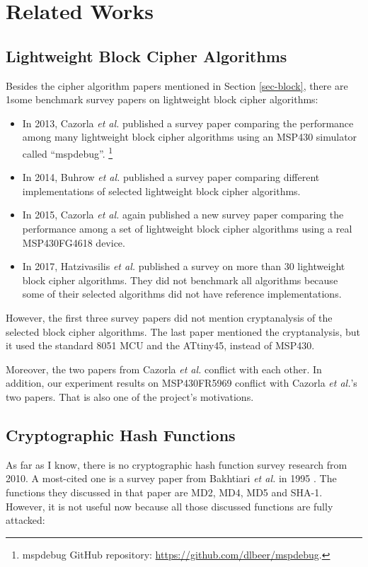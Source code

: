 \documentclass[sigconf, review=false]{acmart}
\begin{document}
\section{Related Works}
\subsection{Lightweight Block Cipher Algorithms}
Besides the cipher algorithm papers mentioned in Section \ref{sec-block},
there are 1some benchmark survey papers on lightweight block cipher algorithms:

\begin{itemize}
    \item In 2013, Cazorla \textit{et al.} published a survey paper comparing the performance among
          many lightweight block cipher algorithms using an MSP430 simulator called ``mspdebug''.
          \footnote{mspdebug GitHub repository: \url{https://github.com/dlbeer/mspdebug}.} \cite{cazorla2013survey}
    \item In 2014, Buhrow \textit{et al.} published a survey paper comparing different implementations
          of selected lightweight block cipher algorithms. \cite{buhrow2014block}
    \item In 2015, Cazorla \textit{et al.} again published a new survey paper comparing the performance among
          a set of lightweight block cipher algorithms using a real MSP430FG4618 device. \cite{cazorla2015survey}
    \item In 2017, Hatzivasilis \textit{et al.} published a survey on more than 30 lightweight block cipher algorithms.
          They did not benchmark all algorithms because some of their selected algorithms did not have reference implementations. \cite{hatzivasilis2017review}
\end{itemize}

However, the first three survey papers did not mention cryptanalysis of the selected block cipher algorithms.
The last paper mentioned the cryptanalysis, but it used the standard 8051 MCU and the ATtiny45, instead of MSP430.

Moreover, the two papers from Cazorla \textit{et al.} conflict with each other.
In addition, our experiment results on MSP430FR5969 conflict with Cazorla \textit{et al.}'s two papers.
That is also one of the project's motivations.

\subsection{Cryptographic Hash Functions}
As far as I know, there is no cryptographic hash function survey research from 2010.
A most-cited one is a survey paper from Bakhtiari \textit{et al.} in 1995 \cite{bakhtiari1995cryptographic}.
The functions they discussed in that paper are MD2, MD4, MD5 and SHA-1.
However, it is not useful now because all those discussed functions are fully attacked:
\end{document}
